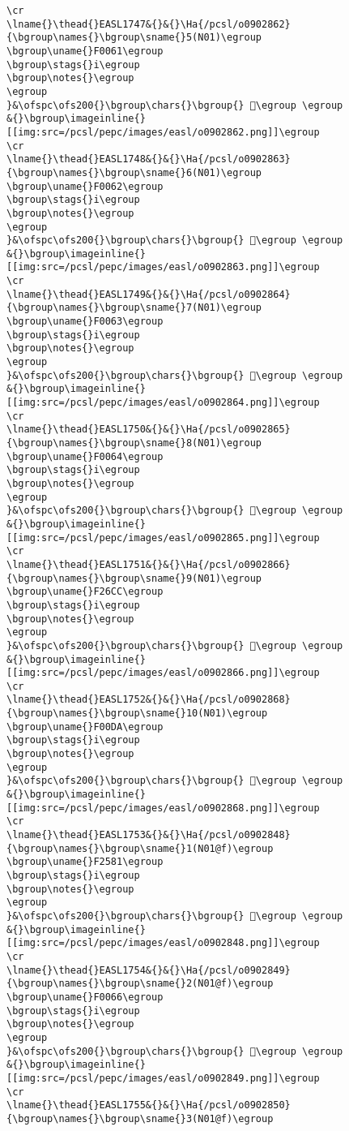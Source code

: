 \begin{verbatim}
\cr
\lname{}\thead{}EASL1747&{}&{}\Ha{/pcsl/o0902862}{\bgroup\names{}\bgroup\sname{}5(N01)\egroup
\bgroup\uname{}F0061\egroup
\bgroup\stags{}i\egroup
\bgroup\notes{}\egroup
\egroup
}&\ofspc\ofs200{}\bgroup\chars{}\bgroup{} 󰁡\egroup \egroup
&{}\bgroup\imageinline{}[[img:src=/pcsl/pepc/images/easl/o0902862.png]]\egroup
\cr
\lname{}\thead{}EASL1748&{}&{}\Ha{/pcsl/o0902863}{\bgroup\names{}\bgroup\sname{}6(N01)\egroup
\bgroup\uname{}F0062\egroup
\bgroup\stags{}i\egroup
\bgroup\notes{}\egroup
\egroup
}&\ofspc\ofs200{}\bgroup\chars{}\bgroup{} 󰁢\egroup \egroup
&{}\bgroup\imageinline{}[[img:src=/pcsl/pepc/images/easl/o0902863.png]]\egroup
\cr
\lname{}\thead{}EASL1749&{}&{}\Ha{/pcsl/o0902864}{\bgroup\names{}\bgroup\sname{}7(N01)\egroup
\bgroup\uname{}F0063\egroup
\bgroup\stags{}i\egroup
\bgroup\notes{}\egroup
\egroup
}&\ofspc\ofs200{}\bgroup\chars{}\bgroup{} 󰁣\egroup \egroup
&{}\bgroup\imageinline{}[[img:src=/pcsl/pepc/images/easl/o0902864.png]]\egroup
\cr
\lname{}\thead{}EASL1750&{}&{}\Ha{/pcsl/o0902865}{\bgroup\names{}\bgroup\sname{}8(N01)\egroup
\bgroup\uname{}F0064\egroup
\bgroup\stags{}i\egroup
\bgroup\notes{}\egroup
\egroup
}&\ofspc\ofs200{}\bgroup\chars{}\bgroup{} 󰁤\egroup \egroup
&{}\bgroup\imageinline{}[[img:src=/pcsl/pepc/images/easl/o0902865.png]]\egroup
\cr
\lname{}\thead{}EASL1751&{}&{}\Ha{/pcsl/o0902866}{\bgroup\names{}\bgroup\sname{}9(N01)\egroup
\bgroup\uname{}F26CC\egroup
\bgroup\stags{}i\egroup
\bgroup\notes{}\egroup
\egroup
}&\ofspc\ofs200{}\bgroup\chars{}\bgroup{} 󲛌\egroup \egroup
&{}\bgroup\imageinline{}[[img:src=/pcsl/pepc/images/easl/o0902866.png]]\egroup
\cr
\lname{}\thead{}EASL1752&{}&{}\Ha{/pcsl/o0902868}{\bgroup\names{}\bgroup\sname{}10(N01)\egroup
\bgroup\uname{}F00DA\egroup
\bgroup\stags{}i\egroup
\bgroup\notes{}\egroup
\egroup
}&\ofspc\ofs200{}\bgroup\chars{}\bgroup{} 󰃚\egroup \egroup
&{}\bgroup\imageinline{}[[img:src=/pcsl/pepc/images/easl/o0902868.png]]\egroup
\cr
\lname{}\thead{}EASL1753&{}&{}\Ha{/pcsl/o0902848}{\bgroup\names{}\bgroup\sname{}1(N01@f)\egroup
\bgroup\uname{}F2581\egroup
\bgroup\stags{}i\egroup
\bgroup\notes{}\egroup
\egroup
}&\ofspc\ofs200{}\bgroup\chars{}\bgroup{} 󲖁\egroup \egroup
&{}\bgroup\imageinline{}[[img:src=/pcsl/pepc/images/easl/o0902848.png]]\egroup
\cr
\lname{}\thead{}EASL1754&{}&{}\Ha{/pcsl/o0902849}{\bgroup\names{}\bgroup\sname{}2(N01@f)\egroup
\bgroup\uname{}F0066\egroup
\bgroup\stags{}i\egroup
\bgroup\notes{}\egroup
\egroup
}&\ofspc\ofs200{}\bgroup\chars{}\bgroup{} 󰁦\egroup \egroup
&{}\bgroup\imageinline{}[[img:src=/pcsl/pepc/images/easl/o0902849.png]]\egroup
\cr
\lname{}\thead{}EASL1755&{}&{}\Ha{/pcsl/o0902850}{\bgroup\names{}\bgroup\sname{}3(N01@f)\egroup

\end{verbatim}
